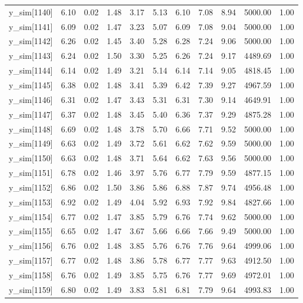 \begin{table}[ht]
\begin{tabular}{rrrrrrrrrrr}
  y\_sim[1140] & 6.10 & 0.02 & 1.48 & 3.17 & 5.13 & 6.10 & 7.08 & 8.94 & 5000.00 & 1.00 \\ 
  y\_sim[1141] & 6.09 & 0.02 & 1.47 & 3.23 & 5.07 & 6.09 & 7.08 & 9.04 & 5000.00 & 1.00 \\ 
  y\_sim[1142] & 6.26 & 0.02 & 1.45 & 3.40 & 5.28 & 6.28 & 7.24 & 9.06 & 5000.00 & 1.00 \\ 
  y\_sim[1143] & 6.24 & 0.02 & 1.50 & 3.30 & 5.25 & 6.26 & 7.24 & 9.17 & 4489.69 & 1.00 \\ 
  y\_sim[1144] & 6.14 & 0.02 & 1.49 & 3.21 & 5.14 & 6.14 & 7.14 & 9.05 & 4818.45 & 1.00 \\ 
  y\_sim[1145] & 6.38 & 0.02 & 1.48 & 3.41 & 5.39 & 6.42 & 7.39 & 9.27 & 4967.59 & 1.00 \\ 
  y\_sim[1146] & 6.31 & 0.02 & 1.47 & 3.43 & 5.31 & 6.31 & 7.30 & 9.14 & 4649.91 & 1.00 \\ 
  y\_sim[1147] & 6.37 & 0.02 & 1.48 & 3.45 & 5.40 & 6.36 & 7.37 & 9.29 & 4875.28 & 1.00 \\ 
  y\_sim[1148] & 6.69 & 0.02 & 1.48 & 3.78 & 5.70 & 6.66 & 7.71 & 9.52 & 5000.00 & 1.00 \\ 
  y\_sim[1149] & 6.63 & 0.02 & 1.49 & 3.72 & 5.61 & 6.62 & 7.62 & 9.59 & 5000.00 & 1.00 \\ 
  y\_sim[1150] & 6.63 & 0.02 & 1.48 & 3.71 & 5.64 & 6.62 & 7.63 & 9.56 & 5000.00 & 1.00 \\ 
  y\_sim[1151] & 6.78 & 0.02 & 1.46 & 3.97 & 5.76 & 6.77 & 7.79 & 9.59 & 4877.15 & 1.00 \\ 
  y\_sim[1152] & 6.86 & 0.02 & 1.50 & 3.86 & 5.86 & 6.88 & 7.87 & 9.74 & 4956.48 & 1.00 \\ 
  y\_sim[1153] & 6.92 & 0.02 & 1.49 & 4.04 & 5.92 & 6.93 & 7.92 & 9.84 & 4827.66 & 1.00 \\ 
  y\_sim[1154] & 6.77 & 0.02 & 1.47 & 3.85 & 5.79 & 6.76 & 7.74 & 9.62 & 5000.00 & 1.00 \\ 
  y\_sim[1155] & 6.65 & 0.02 & 1.47 & 3.67 & 5.66 & 6.66 & 7.66 & 9.49 & 5000.00 & 1.00 \\ 
  y\_sim[1156] & 6.76 & 0.02 & 1.48 & 3.85 & 5.76 & 6.76 & 7.76 & 9.64 & 4999.06 & 1.00 \\ 
  y\_sim[1157] & 6.77 & 0.02 & 1.48 & 3.86 & 5.78 & 6.77 & 7.77 & 9.63 & 4912.50 & 1.00 \\ 
  y\_sim[1158] & 6.76 & 0.02 & 1.49 & 3.85 & 5.75 & 6.76 & 7.77 & 9.69 & 4972.01 & 1.00 \\ 
  y\_sim[1159] & 6.80 & 0.02 & 1.49 & 3.83 & 5.81 & 6.81 & 7.79 & 9.64 & 4993.83 & 1.00 \\ 

\end{tabular}
\end{table}
